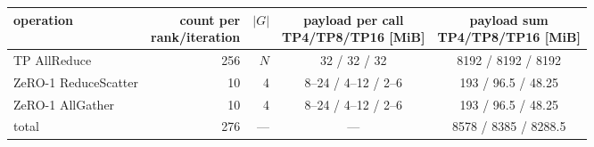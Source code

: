 \begin{tabular}{l r r c c}
  \toprule
  operation & \shortstack{count per\\rank/iteration} & $|G|$
  & \shortstack{payload per call\\TP4/TP8/TP16 [MiB]}
  & \shortstack{payload sum\\TP4/TP8/TP16 [MiB]} \\
  \midrule
  TP AllReduce         & 256 & $N$ & 32 / 32 / 32 & 8192 / 8192 / 8192 \\
  ZeRO-1 ReduceScatter &  10 & 4   & 8--24 / 4--12 / 2--6 & 193 / 96.5 / 48.25 \\
  ZeRO-1 AllGather     &  10 & 4   & 8--24 / 4--12 / 2--6 & 193 / 96.5 / 48.25 \\
  \midrule
  total                & 276 & --- & --- & 8578 / 8385 / 8288.5 \\
  \bottomrule
\end{tabular}
